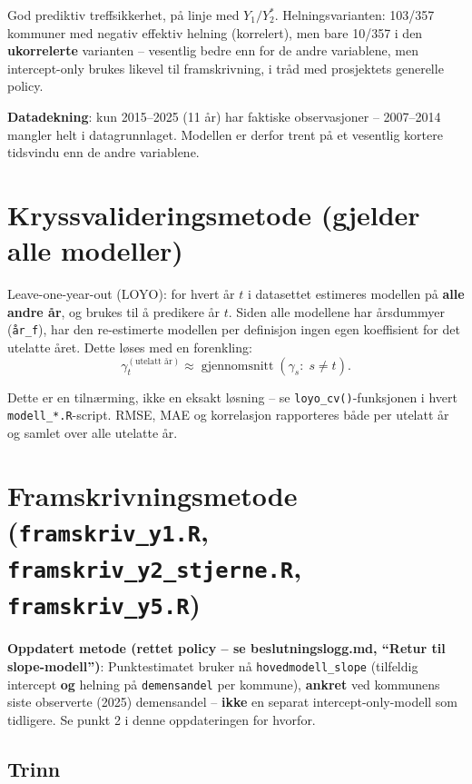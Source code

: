 \documentclass[11pt,a4paper]{article}
\begin{document}
God prediktiv treffsikkerhet, på linje med \(Y_1/Y_2^\ast\).
Helningsvarianten: 103/357 kommuner med negativ effektiv helning
(korrelert), men bare 10/357 i den \textbf{ukorrelerte} varianten --
vesentlig bedre enn for de andre variablene, men intercept-only brukes
likevel til framskrivning, i tråd med prosjektets generelle policy.

\textbf{Datadekning}: kun 2015--2025 (11 år) har faktiske observasjoner --
2007--2014 mangler helt i datagrunnlaget. Modellen er derfor trent på et
vesentlig kortere tidsvindu enn de andre variablene.

\section{Kryssvalideringsmetode (gjelder alle modeller)}

Leave-one-year-out (LOYO): for hvert år \(t\) i datasettet estimeres
modellen på \textbf{alle andre år}, og brukes til å predikere år \(t\).
Siden alle modellene har årsdummyer (\texttt{år\_f}), har den
re-estimerte modellen per definisjon ingen egen koeffisient for det
utelatte året. Dette løses med en forenkling:
\[
\gamma_t^{(\text{utelatt år})}
\approx
\operatorname{gjennomsnitt}
\left(
\gamma_s:\; s \neq t
\right).
\]

Dette er en tilnærming, ikke en eksakt løsning -- se
\texttt{loyo\_cv()}-funksjonen i hvert \texttt{modell\_*.R}-script.
RMSE, MAE og korrelasjon rapporteres både per utelatt år og samlet over
alle utelatte år.

\section{Framskrivningsmetode
(\texttt{framskriv\_y1.R}, \texttt{framskriv\_y2\_stjerne.R},
\texttt{framskriv\_y5.R})}

\textbf{Oppdatert metode (rettet policy -- se beslutningslogg.md,
``Retur til slope-modell'')}: Punktestimatet bruker nå
\texttt{hovedmodell\_slope} (tilfeldig intercept \textbf{og} helning på
\texttt{demensandel} per kommune), \textbf{ankret} ved kommunens siste
observerte (2025) demensandel -- \textbf{ikke} en separat
intercept-only-modell som tidligere. Se punkt 2 i denne oppdateringen for
hvorfor.

\subsection*{Trinn}
\end{document}

